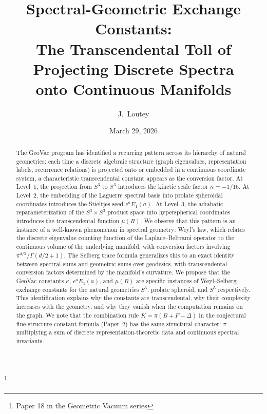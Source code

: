 \documentclass[aps,pra,twocolumn,superscriptaddress,longbibliography]{revtex4-2}
\begin{document}
\title{Spectral-Geometric Exchange Constants:\\
The Transcendental Toll of Projecting Discrete Spectra\\
onto Continuous Manifolds}
\thanks{Paper 18 in the Geometric Vacuum series}

\author{J.~Loutey}

\date{March 29, 2026}


\begin{abstract}
The GeoVac program has identified a recurring pattern across its
hierarchy of natural geometries: each time a discrete algebraic
structure (graph eigenvalues, representation labels, recurrence
relations) is projected onto or embedded in a continuous coordinate
system, a characteristic transcendental constant appears as the
conversion factor.  At Level~1, the projection from $S^3$ to
$\mathbb{R}^3$ introduces the kinetic scale factor
$\kappa = -1/16$.  At Level~2, the embedding of the Laguerre
spectral basis into prolate spheroidal coordinates introduces the
Stieltjes seed $e^a E_1(a)$.  At Level~3, the adiabatic
reparameterization of the $S^3 \times S^3$ product space into
hyperspherical coordinates introduces the transcendental function
$\mu(R)$.  We observe that this pattern is an instance of a
well-known phenomenon in spectral geometry: Weyl's law, which
relates the discrete eigenvalue counting function of the
Laplace--Beltrami operator to the continuous volume of the
underlying manifold, with conversion factors involving
$\pi^{d/2}/\Gamma(d/2+1)$.  The Selberg trace formula generalizes
this to an exact identity between spectral sums and geometric
sums over geodesics, with transcendental conversion factors
determined by the manifold's curvature.  We propose that the
GeoVac constants $\kappa$, $e^a E_1(a)$, and $\mu(R)$ are
specific instances of Weyl--Selberg exchange constants for the
natural geometries $S^3$, prolate spheroid, and $S^5$
respectively.  This identification explains why the constants
are transcendental, why their complexity increases with the
geometry, and why they vanish when the computation remains
on the graph.  We note that the combination rule
$K = \pi(B + F - \Delta)$ in the conjectural fine structure
constant formula (Paper~2) has the same structural character:
$\pi$ multiplying a sum of discrete representation-theoretic
data and continuous spectral invariants.
\end{abstract}
\end{document}
